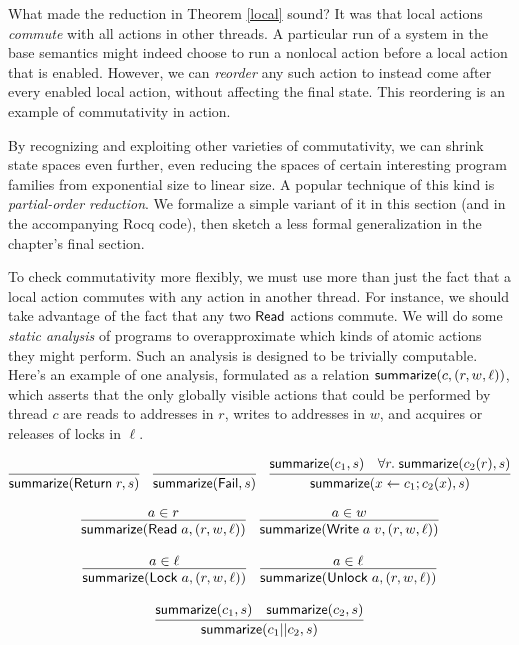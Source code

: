 \documentclass{amsbook}
\theoremstyle{definition}
\theoremstyle{remark}
\numberwithin{section}{chapter}
\numberwithin{equation}{chapter}
\begin{document}
What made the reduction in Theorem \ref{local} sound?
It was that local actions \emph{commute} with all actions in other threads.
A particular run of a system in the base semantics might indeed choose to run a nonlocal action before a local action that is enabled.
However, we can \emph{reorder} any such action to instead come after every enabled local action, without affecting the final state.
This reordering is an example of commutativity in action.

By recognizing and exploiting other varieties of commutativity, we can shrink state spaces even further, even reducing the spaces of certain interesting program families from exponential size to linear size.
A popular technique of this kind is \emph{partial-order reduction}.
We formalize a simple variant of it in this section (and in the accompanying Rocq code), then sketch a less formal generalization in the chapter's final section.

\newcommand{\summ}[2]{\mt{summarize}(#1, #2)}

To check commutativity more flexibly, we must use more than just the fact that a local action commutes with any action in another thread.
For instance, we should take advantage of the fact that any two $\mathsf{Read}$ actions commute.
We will do some \emph{static analysis} of programs to overapproximate which kinds of atomic actions they might perform.
Such an analysis is designed to be trivially computable.
Here's an example of one analysis, formulated as a relation $\summ{c}{(r, w, \ell)}$, which asserts that the only globally visible actions that could be performed by thread $c$ are reads to addresses in $r$, writes to addresses in $w$, and acquires or releases of locks in $\ell$.

$$\infer{\summ{\mt{Return} \; r}{s}}{}
\quad \infer{\summ{\mt{Fail}}{s}}{}
\quad \infer{\summ{x \leftarrow c_1; c_2(x)}{s}}{
    \summ{c_1}{s}
    & \forall r. \; \summ{c_2(r)}{s}
}$$

$$\infer{\summ{\mt{Read} \; a}{(r, w, \ell)}}{
  a \in r
}
\quad \infer{\summ{\mt{Write} \; a \; v}{(r, w, \ell)}}{
  a \in w
}$$

$$\infer{\summ{\mt{Lock} \; a}{(r, w, \ell)}}{
  a \in \ell
}
\quad \infer{\summ{\mt{Unlock} \; a}{(r, w, \ell)}}{
  a \in \ell
}$$

$$\infer{\summ{c_1 || c_2}{s}}{
  \summ{c_1}{s}
  & \summ{c_2}{s}
}$$

\newcommand{\na}[1]{\mt{nextAction}(#1)}
\end{document}
